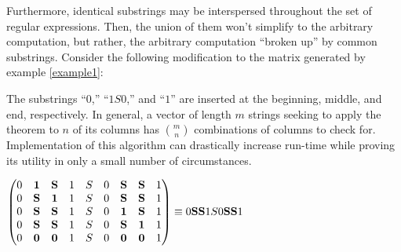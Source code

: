 \documentclass[runningheads]{llncs}
\begin{document}
Furthermore, identical substrings may be interspersed throughout the set of regular expressions. Then, the union of them won't simplify to the arbitrary computation, but rather, the arbitrary computation ``broken up'' by common substrings. Consider the following modification to the matrix generated by example \ref{example1}:\\
\begin{minipage}{.5\textwidth}
The substrings ``$0$,'' ``$1S0$,'' and ``$1$'' are inserted at the beginning, middle, and end, respectively. In general, a vector of length $m$ strings seeking to apply the theorem to $n$ of its columns has $m \choose n$ combinations of columns to check for. Implementation of this algorithm can drastically increase run-time while proving its utility in only a small number of circumstances.
\end{minipage}
\begin{minipage}{.5\textwidth}
\begin{center}
$
\begin{pmatrix}
  0 & \mathbf{1} & \mathbf{S} & 1 & S & 0 & \mathbf{S} & \mathbf{S} & 1\\
  0 & \mathbf{S} & \mathbf{1} & 1 & S & 0 & \mathbf{S} & \mathbf{S} & 1\\
  0 & \mathbf{S} & \mathbf{S} & 1 & S & 0 & \mathbf{1} & \mathbf{S} & 1\\
  0 & \mathbf{S} & \mathbf{S} & 1 & S & 0 & \mathbf{S} & \mathbf{1} & 1\\
  0 & \mathbf{0} & \mathbf{0} & 1 & S & 0 & \mathbf{0} & \mathbf{0} & 1\\
    \end{pmatrix} 
    \vspace{2mm}
    \equiv  0\mathbf{S}\mathbf{S}1S0  \mathbf{S}\mathbf{S}1
$
\end{center}
\end{minipage}
\end{document}
